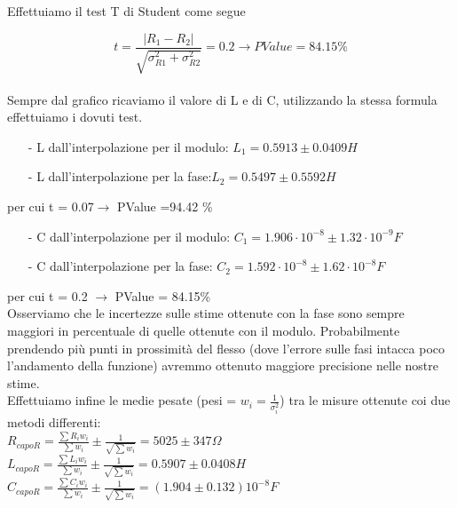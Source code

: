 \documentclass{article}
\theoremstyle{definition}
\begin{document}
\noindent Effettuiamo il test T di Student come segue

\[ t= \frac{\left|R_{1}-R_{2}\right|}{\sqrt{\sigma^2_{R1}+\sigma^2_{R2}}}=0.2\rightarrow PValue = 84.15\% \]\\
 
\noindent Sempre dal grafico ricaviamo il valore di L e di C, utilizzando la stessa formula effettuiamo i dovuti test.

\begin{enumerate}
    \item[-] L dall'interpolazione per il modulo: \(L_{1}= 0.5913 \pm 0.0409 H\)
    \item[-] L dall'interpolazione per la fase:\(L_{2}= 0.5497 \pm 0.5592 H\)

\end{enumerate} 

per cui t = 0.07\(\rightarrow\) PValue =94.42 \%\\

\begin{enumerate}
    \item [-]  C dall'interpolazione per il modulo: \(C_{1}= 1.906\cdot 10^{-8} \pm 1.32\cdot 10^{-9}  F\) 
    \item[-] C dall'interpolazione per la fase: \(C_{2}= 1.592\cdot10^{-8} \pm 1.62\cdot 10^{-8} F \)
\end{enumerate}
 
per cui t = 0.2 \(\rightarrow\) PValue = 84.15\%\\
   
\noindent Osserviamo che le incertezze sulle stime ottenute con la fase sono sempre maggiori in percentuale di quelle ottenute con il modulo. Probabilmente prendendo più punti in prossimità del flesso (dove l'errore sulle fasi intacca poco l'andamento della funzione) avremmo ottenuto maggiore precisione nelle nostre stime. \\
\noindent Effettuiamo infine le medie pesate (pesi = \(w_{i} = \frac{1}{\sigma^{2}_{i}}\)) tra le misure ottenute coi due metodi differenti:\\

\(R_{capoR} = \frac{\sum R_{i}w_{i}}{\sum w_{i}} \pm \frac{1}{\sqrt{\sum w_{i}}}= 5025 \pm 347\Omega\) \\


\(L_{capoR} = \frac{\sum L_{i}w_{i}}{\sum w_{i}} \pm \frac{1}{\sqrt{\sum w_{i}}}= 0.5907 \pm 0.0408 H\) \\

\(C_{capoR} = \frac{\sum C_{i}w_{i}}{\sum w_{i}} \pm \frac{1}{\sqrt{\sum w_{i}}}= (1.904 \pm 0.132) 10^{-8}  F\)\\
\end{document}
